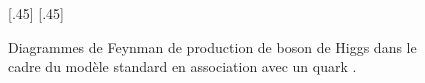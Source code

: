 \begin{figure}[p]
\vspace{2\baselineskip}

\subcaptionbox{\label{subfig-fgraph-Higgs_with_t_qq_g_tth}}[.45\textwidth]
{\vspace{\baselineskip}}
\hfill
\subcaptionbox{\label{subfig-fgraph-Higgs_with_t_gg_htt}}[.45\textwidth]
{\vspace{\baselineskip}}
\caption[Production de boson de Higgs en association avec un quark \quarkt.]{Diagrammes de Feynman de production de boson de Higgs dans le cadre du modèle standard en association avec un quark \quarkt.}
\label{fig-fgraph-Higgs_prod_with_t}
\end{figure}
